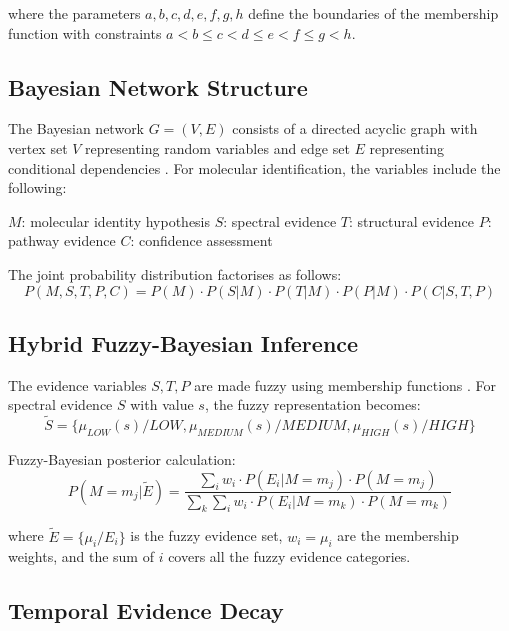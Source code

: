 \documentclass[12pt,a4paper]{article}
\begin{document}
where the parameters $a, b, c, d, e, f, g, h$ define the boundaries of the membership function with constraints $a < b \leq c < d \leq e < f \leq g < h$.

\subsection{Bayesian Network Structure}

The Bayesian network $G = (V, E)$ consists of a directed acyclic graph with vertex set $V$ representing random variables and edge set $E$ representing conditional dependencies \cite{pearl1988probabilistic}. For molecular identification, the variables include the following:

$M$: molecular identity hypothesis
$S$: spectral evidence
$T$: structural evidence  
$P$: pathway evidence
$C$: confidence assessment

The joint probability distribution factorises as follows:
\begin{equation}
P(M, S, T, P, C) = P(M) \cdot P(S|M) \cdot P(T|M) \cdot P(P|M) \cdot P(C|S, T, P)
\end{equation}

\subsection{Hybrid Fuzzy-Bayesian Inference}

The evidence variables $S, T, P$ are made fuzzy using membership functions \cite{mamdani1975experiment}. For spectral evidence $S$ with value $s$, the fuzzy representation becomes:
\begin{equation}
\tilde{S} = \{\mu_{LOW}(s)/LOW, \mu_{MEDIUM}(s)/MEDIUM, \mu_{HIGH}(s)/HIGH\}
\end{equation}

Fuzzy-Bayesian posterior calculation:
\begin{equation}
P(M = m_j | \tilde{E}) = \frac{\sum_{i} w_i \cdot P(E_i | M = m_j) \cdot P(M = m_j)}{\sum_{k} \sum_{i} w_i \cdot P(E_i | M = m_k) \cdot P(M = m_k)}
\end{equation}

where $\tilde{E} = \{\mu_i/E_i\}$ is the fuzzy evidence set, $w_i = \mu_i$ are the membership weights, and the sum of $i$ covers all the fuzzy evidence categories.

\subsection{Temporal Evidence Decay}
\end{document}
